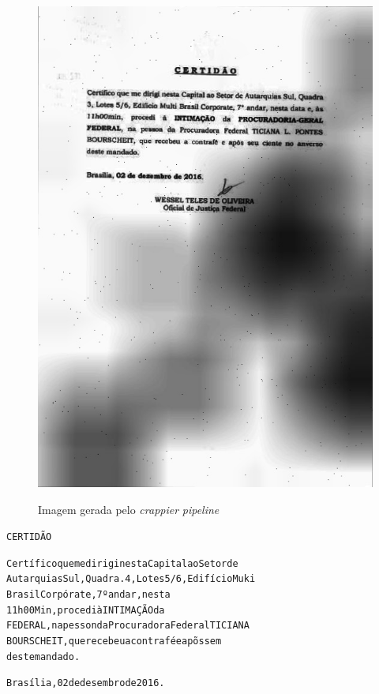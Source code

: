 \begin{figure}[H]
  \centering
  \caption{Imagem gerada pelo \textit{crappier} \textit{pipeline}}
  \includegraphics[scale=.6]{figuras/bad-image-extracted.jpg}
  \label{fig:bad-image-extracted}
\end{figure}

\begin{alltt}
          CERTIDÃO

          Certífico que me dirigi nesta Capital ao Setor de
          Autarquias Sul, Quadra. 4 , Lotes 5/6, Edifício Muki
          Brasil Corpórate, 7º andar, nesta
          11h00Min, procedi à INTIMAÇÃO da
          FEDERAL, na pesson da Procuradora Federal TICIANA
          BOURSCHEIT, que recebeu a contrafé e apõs sem
          deste mandado.

          Brasília, 02 de desembro de 2016.
\end{alltt}

